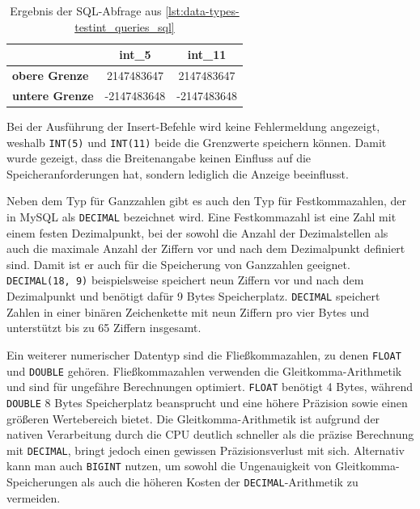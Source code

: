 \vspace{-7pt}

\vspace{-9pt}
\begin{table}[H]
    \centering
    \caption{Ergebnis der SQL-Abfrage aus \ref{lst:data-types-testint_queries_sql}}
    \vspace{-3pt}
    \begin{tabular}{l|c|c}
        & \textbf{int\_5} & \textbf{int\_11} \\ \hline
        \textbf{obere Grenze} & 2147483647 & 2147483647 \\ \hline
        \textbf{untere Grenze} & -2147483648 & -2147483648
    \end{tabular}
    \label{tab:int_values}
\end{table}
\vspace{-9pt}

Bei der Ausführung der Insert-Befehle wird keine Fehlermeldung angezeigt, weshalb \texttt{INT(5)} und \texttt{INT(11)} beide die Grenzwerte speichern können.
Damit wurde gezeigt, dass die Breitenangabe keinen Einfluss auf die Speicheranforderungen hat, sondern lediglich die Anzeige beeinflusst.

Neben dem Typ für Ganzzahlen gibt es auch den Typ für Festkommazahlen, der in MySQL als \texttt{DECIMAL} bezeichnet wird.
Eine Festkommazahl ist eine Zahl mit einem festen Dezimalpunkt, bei der sowohl die Anzahl der Dezimalstellen als auch die maximale Anzahl der Ziffern vor und nach dem Dezimalpunkt definiert sind.
Damit ist er auch für die Speicherung von Ganzzahlen geeignet.
\texttt{DECIMAL(18, 9)} beispielsweise speichert neun Ziffern vor und nach dem Dezimalpunkt und benötigt dafür 9 Bytes Speicherplatz.
\texttt{DECIMAL} speichert Zahlen in einer binären Zeichenkette mit neun Ziffern pro vier Bytes und unterstützt bis zu 65 Ziffern insgesamt.

Ein weiterer numerischer Datentyp sind die Fließkommazahlen, zu denen \texttt{FLOAT} und \texttt{DOUBLE} gehören.
Fließkommazahlen verwenden die Gleitkomma-Arithmetik und sind für ungefähre Berechnungen optimiert.
\texttt{FLOAT} benötigt 4 Bytes, während \texttt{DOUBLE} 8 Bytes Speicherplatz beansprucht und eine höhere Präzision sowie einen größeren Wertebereich bietet.
Die Gleitkomma-Arithmetik ist aufgrund der nativen Verarbeitung durch die CPU deutlich schneller als die präzise Berechnung mit \texttt{DECIMAL}, bringt jedoch einen gewissen Präzisionsverlust mit sich.
Alternativ kann man auch \texttt{BIGINT} nutzen, um sowohl die Ungenauigkeit von Gleitkomma-Speicherungen als auch die höheren Kosten der \texttt{DECIMAL}-Arithmetik zu vermeiden.


